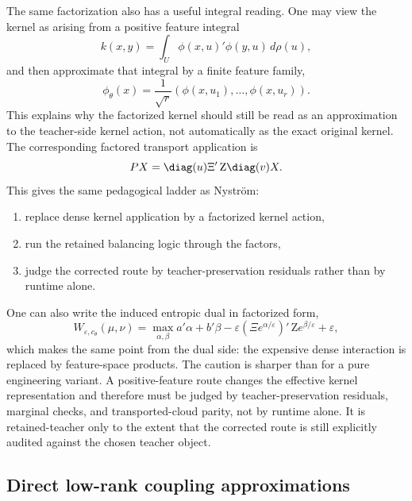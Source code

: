 The same factorization also has a useful integral reading.  One may view the kernel
as arising from a positive feature integral
\begin{equation}
\label{eq:bf-learned-ot-positive-integral}
  k(x,y)
  =
  \int_U \phi(x,u)'\phi(y,u)\,d\rho(u),
\end{equation}
and then approximate that integral by a finite feature family,
\begin{equation}
\label{eq:bf-learned-ot-positive-finite}
  \phi_\theta(x)
  =
  \frac{1}{\sqrt r}
  (\phi(x,u_1),\ldots,\phi(x,u_r)).
\end{equation}
This explains why the factorized kernel should still be read as an approximation to
the teacher-side kernel action, not automatically as the exact original kernel.
The corresponding factored transport
application is
\begin{equation}
\label{eq:bf-learned-ot-positive-transport}
  PX
  =
  \diag(u)\Xi'\,\mathrm Z\diag(v)X.
\end{equation}
This gives the same pedagogical ladder as Nystr{\"o}m:
\begin{enumerate}[label=(\roman*)]
  \item replace dense kernel application by a factorized kernel action,
  \item run the retained balancing logic through the factors,
  \item judge the corrected route by teacher-preservation residuals rather than by
    runtime alone.
\end{enumerate}
One can also write the induced entropic dual in factorized form,
\begin{equation}
\label{eq:bf-learned-ot-positive-dual}
  W_{\varepsilon,c_\theta}(\mu,\nu)
  =
  \max_{\alpha,\beta}
  a'\alpha+b'\beta
  - \varepsilon(\Xi e^{\alpha/\varepsilon})'\,\mathrm Z e^{\beta/\varepsilon}
  + \varepsilon,
\end{equation}
which makes the same point from the dual side: the expensive dense interaction is
replaced by feature-space products.  The caution is sharper than for a pure
engineering variant.  A positive-feature route changes the effective kernel
representation and therefore must be judged by teacher-preservation residuals,
marginal checks, and transported-cloud parity, not by runtime alone.  It is
retained-teacher only to the extent that the corrected route is still explicitly
audited against the chosen teacher object.

\subsection{Direct low-rank coupling approximations}
\label{sec:bf-learned-ot-low-rank}

